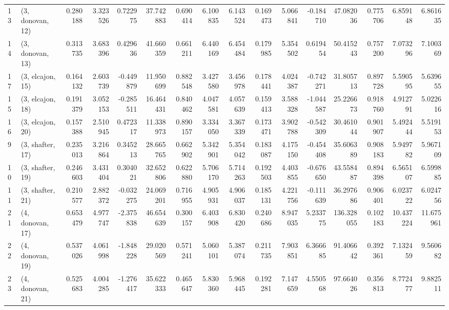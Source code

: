 \begin{tabular}{llrrrrrrrrrrrrrr}
13 &  (3, donovan, 12) &   0.280188 &  3.323526 &  0.722975 &  37.742883 &  0.690414 &   6.100835 &  6.143524 &  0.169473 &  5.066841 & -0.184710 &   47.082036 &  0.775706 &   6.859148 &   6.861635 \\
14 &  (3, donovan, 13) &   0.313735 &  3.683396 &  0.429636 &  41.660359 &  0.661211 &   6.440169 &  6.454484 &  0.179985 &  5.354502 &  0.619454 &   50.415243 &  0.757200 &   7.073296 &   7.100369 \\
17 &  (3, elcajon, 15) &   0.164132 &  2.603739 & -0.449879 &  11.950699 &  0.882548 &   3.427580 &  3.456978 &  0.178441 &  4.024387 & -0.742271 &   31.805713 &  0.897728 &   5.590595 &   5.639655 \\
15 &  (3, elcajon, 18) &   0.191379 &  3.052153 & -0.285511 &  16.464431 &  0.840462 &   4.047581 &  4.057639 &  0.159413 &  3.588328 & -1.044587 &   25.226673 &  0.918760 &   4.912791 &   5.022616 \\
16 &  (3, elcajon, 20) &   0.157388 &  2.510945 &  0.472317 &  11.338973 &  0.890157 &   3.334050 &  3.367339 &  0.173471 &  3.902788 & -0.542309 &   30.461044 &  0.901907 &   5.492444 &   5.519153 \\
9  &  (3, shafter, 17) &   0.235013 &  3.216864 &  0.345213 &  28.665765 &  0.662902 &   5.342901 &  5.354042 &  0.183087 &  4.175150 & -0.454408 &   35.606389 &  0.908183 &   5.949782 &   5.967109 \\
10 &  (3, shafter, 19) &   0.246603 &  3.431404 &  0.304021 &  32.652806 &  0.622880 &   5.706170 &  5.714263 &  0.192503 &  4.403855 & -0.676650 &   43.558487 &  0.894398 &   6.565107 &   6.599885 \\
11 &  (3, shafter, 21) &   0.210577 &  2.882372 & -0.032275 &  24.069201 &  0.716955 &   4.905931 &  4.906037 &  0.185131 &  4.221756 & -0.111639 &   36.297686 &  0.906401 &   6.023722 &   6.024756 \\
21 &  (4, donovan, 17) &   0.653479 &  4.977747 & -2.375838 &  46.654639 &  0.300157 &   6.403908 &  6.830420 &  0.240686 &  8.947035 &  5.233775 &  136.328055 &  0.102183 &  10.437224 &  11.675961 \\
22 &  (4, donovan, 19) &   0.537026 &  4.061998 & -1.848228 &  29.020569 &  0.571241 &   5.060101 &  5.387074 &  0.211735 &  7.903851 &  6.366685 &   91.406642 &  0.392361 &   7.132459 &   9.560682 \\
23 &  (4, donovan, 21) &   0.525683 &  4.004285 & -1.276417 &  35.622333 &  0.465647 &   5.830360 &  5.968445 &  0.192281 &  7.147659 &  4.550568 &   97.664026 &  0.356813 &   8.772477 &   9.882511 \\

\end{tabular}
